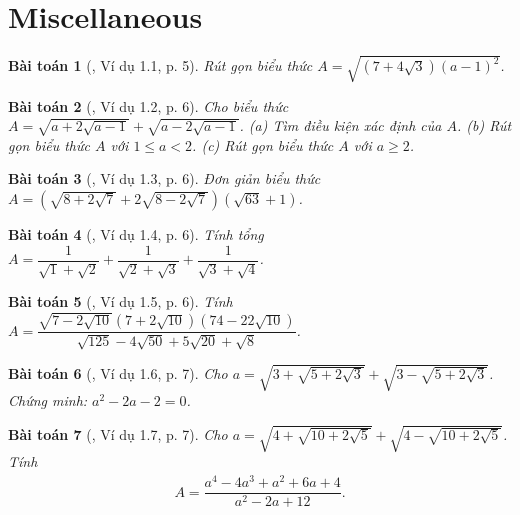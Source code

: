 \documentclass{article}
\newtheorem{baitoan}{Bài toán}
\begin{document}

\section{Miscellaneous}

\begin{baitoan}[\cite{TLCT_THCS_Toan_9_dai_so}, Ví dụ 1.1, p. 5]
	Rút gọn biểu thức $A = \sqrt{(7 + 4\sqrt{3})(a - 1)^2}$.
\end{baitoan}

\begin{baitoan}[\cite{TLCT_THCS_Toan_9_dai_so}, Ví dụ 1.2, p. 6]
	Cho biểu thức $A = \sqrt{a + 2\sqrt{a - 1}} + \sqrt{a - 2\sqrt{a - 1}}$. (a) Tìm điều kiện xác định của $A$. (b) Rút gọn biểu thức $A$ với $1\le a < 2$. (c) Rút gọn biểu thức $A$ với $a\ge2$.
\end{baitoan}

\begin{baitoan}[\cite{TLCT_THCS_Toan_9_dai_so}, Ví dụ 1.3, p. 6]
	Đơn giản biểu thức $A = \left(\sqrt{8 + 2\sqrt{7}} + 2\sqrt{8 - 2\sqrt{7}}\right)(\sqrt{63} + 1)$.
\end{baitoan}

\begin{baitoan}[\cite{TLCT_THCS_Toan_9_dai_so}, Ví dụ 1.4, p. 6]
	Tính tổng $A = \dfrac{1}{\sqrt{1} + \sqrt{2}} + \dfrac{1}{\sqrt{2} + \sqrt{3}} + \dfrac{1}{\sqrt{3} + \sqrt{4}}$.
\end{baitoan}

\begin{baitoan}[\cite{TLCT_THCS_Toan_9_dai_so}, Ví dụ 1.5, p. 6]
	Tính $A = \dfrac{\sqrt{7 - 2\sqrt{10}}(7 + 2\sqrt{10})(74 - 22\sqrt{10})}{\sqrt{125} - 4\sqrt{50} + 5\sqrt{20} + \sqrt{8}}$.
\end{baitoan}

\begin{baitoan}[\cite{TLCT_THCS_Toan_9_dai_so}, Ví dụ 1.6, p. 7]
	Cho $a = \sqrt{3 + \sqrt{5 + 2\sqrt{3}}} + \sqrt{3 - \sqrt{5 + 2\sqrt{3}}}$. Chứng minh: $a^2 - 2a - 2 = 0$.
\end{baitoan}

\begin{baitoan}[\cite{TLCT_THCS_Toan_9_dai_so}, Ví dụ 1.7, p. 7]
	Cho $a = \sqrt{4 + \sqrt{10 + 2\sqrt{5}}} + \sqrt{4 - \sqrt{10 + 2\sqrt{5}}}$. Tính
	\begin{align*}
		A = \dfrac{a^4 - 4a^3 + a^2 + 6a + 4}{a^2 - 2a + 12}.
	\end{align*}
\end{baitoan}
\end{document}
